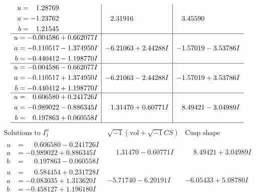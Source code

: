\documentclass[1p]{elsarticle_modified}
\theoremstyle{definition}
\newcommand{\I}{\sqrt{-1}}
\begin{document}
$$\begin{array}{c|c|c}
\begin{aligned}
u &= \phantom{-}1.28769\phantom{ +0.000000I} \\
a &= -1.23762\phantom{ +0.000000I} \\
b &= \phantom{-}1.21545\phantom{ +0.000000I}\end{aligned}
 & \phantom{-}2.31916\phantom{ +0.000000I} & \phantom{-}3.45590\phantom{ +0.000000I} \\ \hline\begin{aligned}
u &= -0.004586 + 0.662077 I \\
a &= -0.110517 - 1.374950 I \\
b &= -0.440412 - 1.198770 I\end{aligned}
 & -6.21063 + 2.44288 I & -1.57019 - 3.53786 I \\ \hline\begin{aligned}
u &= -0.004586 - 0.662077 I \\
a &= -0.110517 + 1.374950 I \\
b &= -0.440412 + 1.198770 I\end{aligned}
 & -6.21063 - 2.44288 I & -1.57019 + 3.53786 I \\ \hline\begin{aligned}
u &= \phantom{-}0.606580 + 0.241726 I \\
a &= -0.989022 - 0.886345 I \\
b &= \phantom{-}0.197863 + 0.060558 I\end{aligned}
 & \phantom{-}1.31470 + 0.60771 I & \phantom{-}8.49421 - 3.04989 I\\
 \hline 
 \end{array}$$\newpage$$\begin{array}{c|c|c}  
\text{Solutions to }I^u_{1}& \I (\text{vol} + \sqrt{-1}CS) & \text{Cusp shape}\\
 \hline 
\begin{aligned}
u &= \phantom{-}0.606580 - 0.241726 I \\
a &= -0.989022 + 0.886345 I \\
b &= \phantom{-}0.197863 - 0.060558 I\end{aligned}
 & \phantom{-}1.31470 - 0.60771 I & \phantom{-}8.49421 + 3.04989 I \\ \hline\begin{aligned}
u &= \phantom{-}0.584454 + 0.231728 I \\
a &= -0.083035 + 1.313620 I \\
b &= -0.458127 + 1.196180 I\end{aligned}
 & -5.71740 - 6.20191 I & -6.05433 + 5.08780 I \\ \hline\begin{aligned}

\end{aligned}
\end{array}$$
\end{document}

